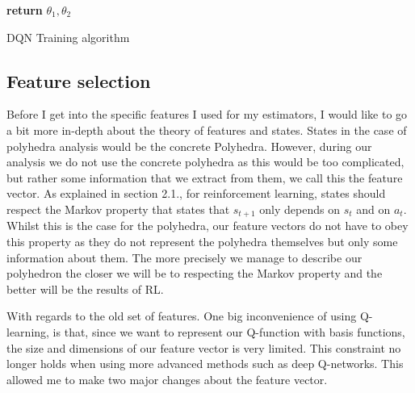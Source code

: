 \begin{center}
\begin{algorithm}[H]
{{     \Indm
     \Indp{}
		\Indm
	\Indp{}\Indm
	\Indp{}
			
    }
    
   }
   \textbf{return} $\theta_1,\theta_2$
    
\caption{DQN Training algorithm}
\end{algorithm}
\end{center}



\subsection{Feature selection}
Before I get into the specific features I used for my estimators, I would like to go a bit more in-depth about the theory of features and states. States in the case of polyhedra analysis would be the concrete Polyhedra. However, during our analysis we do not use the concrete polyhedra as this would be too complicated, but rather some information that we extract from them, we call this the feature vector. As explained in section 2.1., for reinforcement learning, states should respect the Markov property that states that $s_{t+1}$ only depends on $s_t$ and on $a_t$. Whilst this is the case for the polyhedra, our feature vectors do not have to obey this property as they do not represent the polyhedra themselves but only some information about them. The more precisely we manage to describe our polyhedron the closer we will be to respecting the Markov property and the better will be the results of RL. 

With regards to the old set of features. One big inconvenience of using Q-learning, is that, since we want to represent our Q-function with basis functions, the size and dimensions of our feature vector is very limited. This constraint no longer holds when using more advanced methods such as deep Q-networks. This allowed me to make two major changes about the feature vector. 

